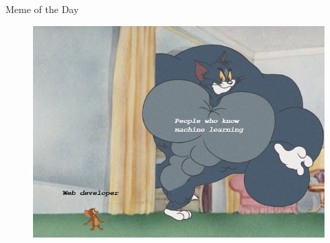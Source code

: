 \begin{frame}{Meme of the Day}{}
	\begin{figure}
		\includegraphics[scale=0.45]{01_intro_ml/02_img/meme_of_the_day}
	\end{figure}
\end{frame}


\makethanks

